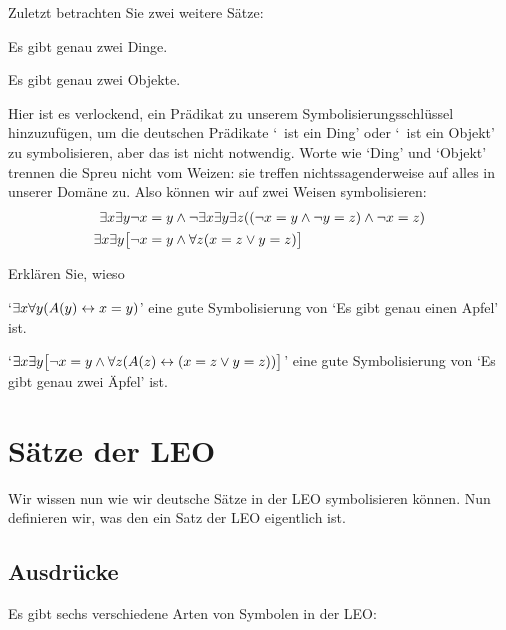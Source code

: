 Zuletzt betrachten Sie zwei weitere Sätze:
\begin{earg}
\item[\ex{exactly2things}] Es gibt genau zwei Dinge.
\item[\ex{exactly2objects}] Es gibt genau zwei Objekte.
\end{earg}
Hier ist es verlockend, ein Prädikat zu unserem Symbolisierungsschlüssel hinzuzufügen, um die deutschen Prädikate `\blank\ ist ein Ding' oder `\blank\ ist ein Objekt' zu symbolisieren, aber das ist nicht notwendig. Worte wie `Ding' und `Objekt' trennen die Spreu nicht vom Weizen: sie treffen nichtssagenderweise auf alles in unserer Domäne zu. Also können wir auf zwei Weisen symbolisieren:
	\begin{align*}
		\exists x \exists y \neg x = y & \wedge  \neg \exists x \exists y \exists z ((\neg x = y \wedge \neg y = z) \wedge \neg x = z) \\
		\exists x \exists y \bigl[\neg x = y & \wedge \forall z(x = z \vee y = z)\bigr]
	\end{align*}

\practiceproblems

\problempart Erklären Sie, wieso
	\begin{ebullet}
		\item   `$\exists x \forall y(\mathord{A}(y) \leftrightarrow x = y)$' eine gute Symbolisierung von `Es gibt genau einen Apfel' ist.
		\item `$\exists x \exists y \bigl[\neg x = y \wedge \forall z(\mathord{A}(z) \leftrightarrow (x= z \vee y = z))\bigr]$' eine gute Symbolisierung von `Es gibt genau zwei Äpfel' ist.
	\end{ebullet}		


\chapter{Sätze der LEO}\label{s:FOLSentences}
Wir wissen nun wie wir deutsche Sätze in der LEO symbolisieren können. Nun definieren wir, was den ein Satz der LEO eigentlich ist.

\section{Ausdrücke}
Es gibt sechs verschiedene Arten von Symbolen in der LEO:


